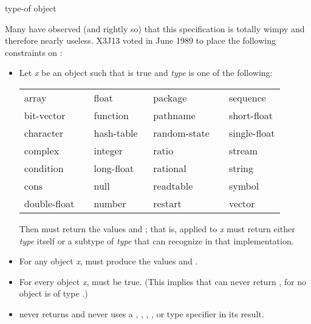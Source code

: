 \begin{defun}[Function]
type-of object

\begin{new}
Many have observed (and rightly so) that this specification is totally wimpy
and therefore nearly useless.  X3J13 voted in June 1989
to place the following constraints on :

\begin{itemize}
\item
Let \emph{x} be an object such that 
is true and \emph{type} is one of the following:

\begin{flushleft}
\cf
\begin{tabular}{@{}llll@{}}
array          & float        & package        & sequence \\
bit-vector     & function     & pathname       & short-float \\
character      & hash-table   & random-state~~ & single-float \\
complex        & integer      & ratio          & stream \\
condition      & long-float~~ & rational       & string \\
cons           & null         & readtable      & symbol \\
double-float~~ & number       & restart        & vector
\end{tabular}
\end{flushleft}

Then
must return the values  and ; that is,  applied
to \emph{x} must return either \emph{type} itself or a subtype of \emph{type}
that  can recognize in that implementation.

\item
For any object \emph{x}, 
must produce the values  and .

\item
For every object \emph{x}, 
must be true.  (This implies that  can never return ,
for no object is of type .)

\item
{} never returns  and never uses
a , , , ,
or  type specifier in its result.


\end{itemize}
\end{new}
\end{defun}
